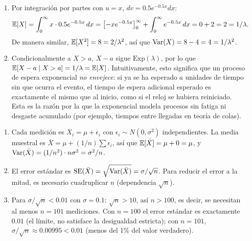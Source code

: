 \begin{solproblema}[prob:f43c638]
	\begin{enumerate}
		\item Por integración por partes con $u=x$, $dv=0.5e^{-0.5x}dx$:
		\begin{align*}
			\mathbb{E}[X] = \int_{0}^{\infty} x \cdot 0.5 e^{-0.5x}\,dx = \left[-xe^{-0.5x}\right]_0^\infty + \int_0^\infty e^{-0.5x}\,dx = 0+2 = 2 = 1/\lambda.
		\end{align*}
		De manera similar, $\mathbb{E}[X^2] = 8 = 2/\lambda^2$, así que $\operatorname{Var}(X) = 8-4=4=1/\lambda^2$.
		\item Condicionalmente a $X>a$, $X-a$ sigue $\text{Exp}(\lambda)$, por lo que $\mathbb{E}[X-a\mid X>a] = 1/\lambda = \mathbb{E}[X]$. Intuitivamente, esto significa que un proceso de espera exponencial \emph{no envejece}: si ya se ha esperado $a$ unidades de tiempo sin que ocurra el evento, el tiempo de espera adicional esperado es exactamente el mismo que al inicio, como si el reloj se hubiera reiniciado. Esta es la razón por la que la exponencial modela procesos sin fatiga ni desgaste acumulado (por ejemplo, tiempos entre llegadas en teoría de colas).
	\end{enumerate}
\end{solproblema}

\begin{solproblema}[prob:7b147c4]
	\begin{enumerate}
		\item Cada medición es $X_i=\mu+\epsilon_i$ con $\epsilon_i\sim N(0,\sigma^2)$ independientes. La media muestral es $\bar{X}=\mu+(1/n)\sum\epsilon_i$, así que $\mathbb{E}[\bar{X}]=\mu+0=\mu$, y $\operatorname{Var}(\bar{X})=(1/n^2)\cdot n\sigma^2=\sigma^2/n$.
		\item El error estándar es $\text{SE}(\bar{X})=\sqrt{\operatorname{Var}(\bar{X})}=\sigma/\sqrt{n}$. Para reducir el error a la mitad, es necesario cuadruplicar $n$ (dependencia $\sqrt{n}$).
		\item Para $\sigma/\sqrt{n}<0.01$ con $\sigma=0.1$: $\sqrt{n}>10$, así $n>100$, es decir, se necesitan al menos $n=101$ mediciones. Con $n=100$ el error estándar es exactamente $0.01$ (el límite, no satisface la desigualdad estricta); con $n=101$, $\sigma/\sqrt{n}\approx0.00995<0.01$ (menos del 1\% del valor verdadero).
	\end{enumerate}
\end{solproblema}

